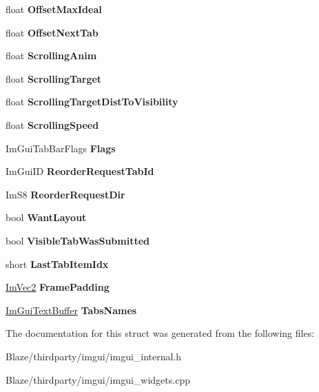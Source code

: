 \begin{DoxyCompactItemize}
float {\bfseries Offset\+Max\+Ideal}
\item 
\mbox{\label{structImGuiTabBar_ad90200df01295cd68aae528b275d918b}} 
float {\bfseries Offset\+Next\+Tab}
\item 
\mbox{\label{structImGuiTabBar_a0f8c0995a150b9f9439e2f02afc3936f}} 
float {\bfseries Scrolling\+Anim}
\item 
\mbox{\label{structImGuiTabBar_a1b7c74460402870d7ba50a798ba66365}} 
float {\bfseries Scrolling\+Target}
\item 
\mbox{\label{structImGuiTabBar_abc96e776c9f9d14b3f1fb6bdb8b5e5ac}} 
float {\bfseries Scrolling\+Target\+Dist\+To\+Visibility}
\item 
\mbox{\label{structImGuiTabBar_a402f9de25e4323587d9f289678896fca}} 
float {\bfseries Scrolling\+Speed}
\item 
\mbox{\label{structImGuiTabBar_aa528c4c6a2b733caf8f4d83828077d87}} 
Im\+Gui\+Tab\+Bar\+Flags {\bfseries Flags}
\item 
\mbox{\label{structImGuiTabBar_a63b10062043a569efbb55462602d7b27}} 
Im\+Gui\+ID {\bfseries Reorder\+Request\+Tab\+Id}
\item 
\mbox{\label{structImGuiTabBar_adb5c5e4dd8c0331a229dd9e38042677f}} 
Im\+S8 {\bfseries Reorder\+Request\+Dir}
\item 
\mbox{\label{structImGuiTabBar_acf92c2132df97eae310b391d894d261d}} 
bool {\bfseries Want\+Layout}
\item 
\mbox{\label{structImGuiTabBar_a9112067953a14bc707d2660dc1cf93b0}} 
bool {\bfseries Visible\+Tab\+Was\+Submitted}
\item 
\mbox{\label{structImGuiTabBar_ae787a0905614236c8a88195316cde5f7}} 
short {\bfseries Last\+Tab\+Item\+Idx}
\item 
\mbox{\label{structImGuiTabBar_aa0319aebb5c59e026486f60b68642ee6}} 
\hyperlink{structImVec2}{Im\+Vec2} {\bfseries Frame\+Padding}
\item 
\mbox{\label{structImGuiTabBar_afe5bda8cfea073a5d51a1d2bc023ef74}} 
\hyperlink{structImGuiTextBuffer}{Im\+Gui\+Text\+Buffer} {\bfseries Tabs\+Names}
\end{DoxyCompactItemize}


The documentation for this struct was generated from the following files\+:\begin{DoxyCompactItemize}
\item 
Blaze/thirdparty/imgui/imgui\+\_\+internal.\+h\item 
Blaze/thirdparty/imgui/imgui\+\_\+widgets.\+cpp\end{DoxyCompactItemize}
